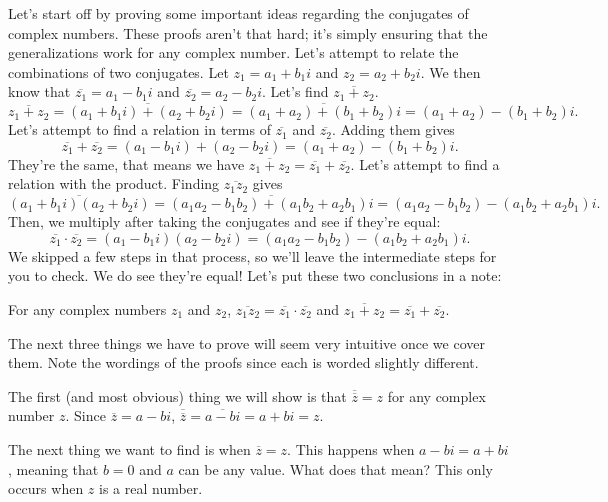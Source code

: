 \documentclass[lang=en,11pt]{elegantbook}
\begin{document}
Let's start off by proving some important ideas regarding the conjugates of complex numbers.  These proofs aren't that hard; it's simply ensuring that the generalizations work for any complex number.  Let's attempt to relate the combinations of two conjugates.  Let $z_1=a_1+b_1i$ and $z_2=a_2+b_2i$.  We then know that $\overline{z_1}=a_1-b_1i$ and $\overline{z_2}=a_2-b_2i$.  Let's find $\overline{z_1+z_2}$.  $$\overline{z_1+z_2}=\overline{\left(a_1+b_1i\right)+\left(a_2+b_2i\right)}=\overline{\left(a_1+a_2\right)+\left(b_1+b_2\right)i}=\left(a_1+a_2\right)-\left(b_1+b_2\right)i.$$
Let's attempt to find a relation in terms of $\overline{z_1}$ and $\overline{z_2}$.  Adding them gives $$\overline{z_1}+\overline{z_2}=\left(a_1-b_1i\right)+\left(a_2-b_2i\right)=\left(a_1+a_2\right)-\left(b_1+b_2\right)i.$$  They're the same, that means we have $\overline{z_1+z_2}=\overline{z_1}+\overline{z_2}$.  Let's attempt to find a relation with the product.  Finding $\overline{z_1z_2}$ gives $$\overline{\left(a_1+b_1i\right)\left(a_2+b_2i\right)}=\overline{\left(a_1a_2-b_1b_2\right)+\left(a_1b_2+a_2b_1\right)i}=\left(a_1a_2-b_1b_2\right)-\left(a_1b_2+a_2b_1\right)i.$$
Then, we multiply after taking the conjugates and see if they're equal:
$$\overline{z_1}\cdot\overline{z_2}=\left(a_1-b_1i\right)\left(a_2-b_2i\right)=\left(a_1a_2-b_1b_2\right)-\left(a_1b_2+a_2b_1\right)i.$$
We skipped a few steps in that process, so we'll leave the intermediate steps for you to check.  We do see they're equal!  Let's put these two conclusions in a note:
\begin{note}
For any complex numbers $z_1$ and $z_2$, $\overline{z_1z_2}=\overline{z_1}\cdot \overline{z_2}$ and $\overline{z_1+z_2}=\overline{z_1}+\overline{z_2}$.
\end{note}

The next three things we have to prove will seem very intuitive once we cover them.  Note the wordings of the proofs since each is worded slightly different.

The first (and most obvious) thing we will show is that $\overline{\overline{z}}=z$ for any complex number $z$.  Since $\overline{z}=a-bi$, $\overline{\overline{z}}=\overline{a-bi}=a+bi=z$.  

The next thing we want to find is when $\overline{z}=z$.  This happens when $a-bi=a+bi$, meaning that $b=0$ and $a$ can be any value.  What does that mean?  This only occurs when $z$ is a real number.
\end{document}
